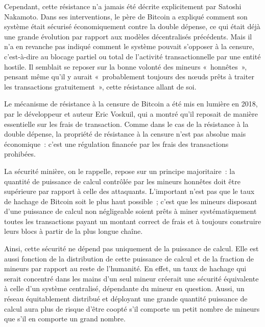 Cependant, cette résistance n'a jamais été décrite explicitement par Satoshi Nakamoto. Dans ses interventions, le père de Bitcoin a expliqué comment son système était sécurisé économiquement contre la double dépense, ce qui était déjà une grande évolution par rapport aux modèles décentralisés précédents. Mais il n'a en revanche pas indiqué comment le système pouvait s'opposer à la censure, c'est-à-dire au blocage partiel ou total de l'activité transactionnelle par une entité hostile. Il semblait se reposer sur la bonne volonté des mineurs «~honnêtes~», pensant même qu'il y aurait «~probablement toujours des nœuds prêts à traiter les transactions gratuitement~», cette résistance allant de soi.

Le mécanisme de résistance à la censure de Bitcoin a été mis en lumière en 2018, par le développeur et auteur Eric Voskuil, qui a montré qu'il reposait de manière essentielle sur les frais de transaction. Comme dans le cas de la résistance à la double dépense, la propriété de résistance à la censure n'est pas absolue mais économique~: c'est une régulation financée par les frais des transactions prohibées.

La sécurité minière, on le rappelle, repose sur un principe majoritaire~: la quantité de puissance de calcul contrôlée par les mineurs honnêtes doit être supérieure par rapport à celle des attaquants. L'important n'est pas que le taux de hachage de Bitcoin soit le plus haut possible~; c'est que les mineurs disposant d'une puissance de calcul non négligeable soient prêts à miner systématiquement toutes les transactions payant un montant correct de frais et à toujours construire leurs blocs à partir de la plus longue chaîne. %

Ainsi, cette sécurité ne dépend pas uniquement de la puissance de calcul. Elle est aussi fonction de la distribution de cette puissance de calcul et de la fraction de mineurs par rapport au reste de l'humanité. En effet, un taux de hachage qui serait concentré dans les mains d'un seul mineur créerait une sécurité équivalente à celle d'un système centralisé, dépendante du mineur en question. Aussi, un réseau équitablement distribué et déployant une grande quantité puissance de calcul aura plus de risque d'être coopté s'il comporte un petit nombre de mineurs que s'il en comporte un grand nombre.

